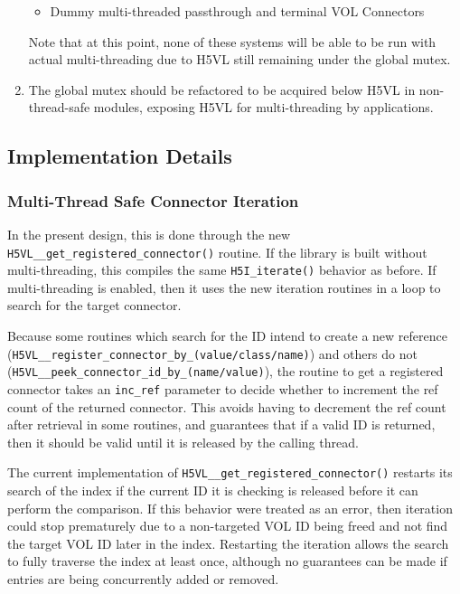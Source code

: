 \documentclass{article}
\begin{document}
\begin{enumerate}
\begin{itemize}
        \item Dummy multi-threaded passthrough and terminal VOL Connectors 
    \end{itemize}
    
    Note that at this point, none of these systems will be able to be run with actual multi-threading due to H5VL still remaining under the global mutex.

    \item The global mutex should be refactored to be acquired below H5VL in non-thread-safe modules, exposing H5VL for multi-threading by applications.
\end{enumerate}

\subsection{Implementation Details}

\subsubsection{Multi-Thread Safe Connector Iteration}

 In the present design, this is done through the new \texttt{H5VL\_\_get\_registered\_connector()} routine. If the library is built without multi-threading, this compiles the same \texttt{H5I\_iterate()} behavior as before. If multi-threading is enabled, then it uses the new iteration routines in a loop to search for the target connector.

Because some routines which search for the ID intend to create a new reference \\ (\texttt{H5VL\_\_register\_connector\_by\_(value/class/name)}) and others do not \\ (\texttt{H5VL\_\_peek\_connector\_id\_by\_(name/value)}), the routine to get a registered connector takes an \texttt{inc\_ref} parameter to decide whether to increment the ref count of the returned connector. This avoids having to decrement the ref count after retrieval in some routines, and guarantees that if a valid ID is returned, then it should be valid until it is released by the calling thread.

The current implementation of \texttt{H5VL\_\_get\_registered\_connector()} restarts its search of the index if the current ID it is checking is released before it can perform the comparison. If this behavior were treated as an error, then iteration could stop prematurely due to a non-targeted VOL ID being freed and not find the target VOL ID later in the index. Restarting the iteration allows the search to fully traverse the index at least once, although no guarantees can be made if entries are being concurrently added or removed.
\end{document}
